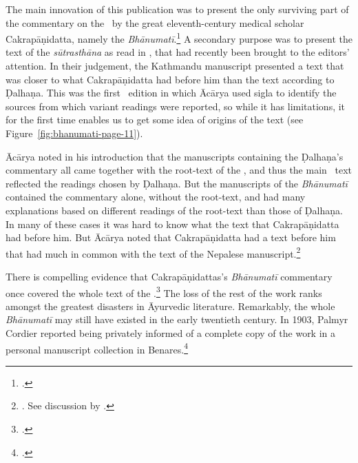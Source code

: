 The main innovation of this publication was to present the only surviving part of
the commentary on the \SS\ by the great eleventh-century medical scholar
Cakrapāṇidatta, namely the \emph{Bhānumatī}.\footcite[IA, 374--375 and IB,
495--496]{meul-hist} A secondary purpose was to present the text of the
\emph{sūtrasthāna} as read in , that had recently been
brought to the editors' attention. In their judgement, the Kathmandu manuscript
presented a text that was closer to what Cakrapāṇidatta had before him than the
text according to Ḍalhaṇa.   This was the first \SS\ edition in which Ācārya used
sigla to identify the sources from which variant readings were reported, so while
it has limitations, it for the first time enables us to get some idea of origins
of the text (see Figure~\ref{fig:bhanumati-page-11}).

Ācārya noted in his introduction that the manuscripts containing the Ḍalhaṇa's
commentary all came together with the root-text of the \SS, and thus the main \SS\
text reflected the readings chosen by Ḍalhaṇa.  But the manuscripts of the
\emph{Bhānumatī} contained the commentary alone, without the root-text, and had
many explanations based on different readings of the root-text than those of
Ḍalhaṇa.  In many of these cases it was hard to know what the text that
Cakrapāṇidatta had before him. But Ācārya noted that Cakrapāṇidatta had a text
before him that had much in common with the text of the Nepalese
manuscript.\footnote{\cite[3--4]{acar-1939}.  See discussion by
\citet[7]{kleb-2021a}.}  

There is compelling evidence that Cakrapāṇidattas's \emph{Bhānumatī} commentary
once covered the whole text of the \SS.\footcite[IA, 375]{meul-hist}  The loss of
the rest of the work ranks amongst the greatest disasters in Āyurvedic
literature.  Remarkably, the whole \emph{Bhānumatī} may still have existed in the
early twentieth century. In 1903, Palmyr Cordier reported being privately informed
of a complete copy of the work in a personal manuscript collection in
Benares.\footcite[332]{cord-1903}
